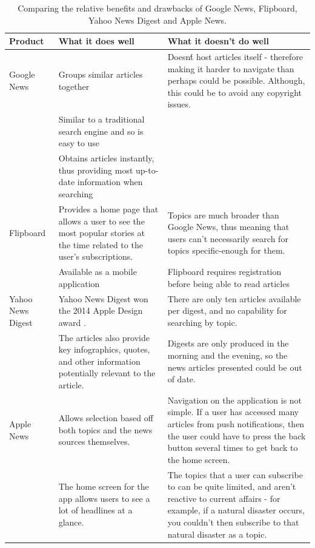 \documentclass[12pt]{article}
\newcommand{\tabitem}{\makebox[1em][r]{\textbullet~}}
\begin{document}
\begin{table}
    \begin{tabular}{p{2.5cm}|p{8.75cm}|p{8.75cm}}
    \textbf{Product} & \textbf{What it does well} & \textbf{What it doesn't do well} \\ \hline
    Google News & \tabitem Groups similar articles together & \tabitem Doesn\'t host articles itself - therefore making it harder to navigate than perhaps could be possible. Although, this could be to avoid any copyright issues. \\ & \tabitem Similar to a traditional search engine and so is easy to use\\ & \tabitem Obtains articles instantly, thus providing most up-to-date information when searching  \\ \hline
    Flipboard & \tabitem Provides a home page that allows a user to see the most popular stories at the time related to the user's subscriptions. & \tabitem Topics are much broader than Google News, thus meaning that users can't necessarily search for topics specific-enough for them.\\ & \tabitem Available as a mobile application & \tabitem Flipboard requires registration before being able to read articles \\ \hline
    Yahoo News Digest & \tabitem Yahoo News Digest won the 2014 Apple\index{Apple} Design award \cite{appleDesignAward}\index{Apple!Design award}. & \tabitem There are only ten articles available per digest, and no capability for searching by topic. \\ & \tabitem The articles also provide key infographics, quotes, and other information potentially relevant to the article. & \tabitem Digests are only produced in the morning and the evening, so the news articles presented could be out of date. \\ \hline
    Apple News & \tabitem Allows selection based off both topics and the news sources themselves. & \tabitem Navigation on the application is not simple. If a user has accessed many articles from push notifications, then the user could have to press the back button several times to get back to the home screen.\\ & \tabitem The home screen for the app allows users to see a lot of headlines at a glance. & \tabitem The topics that a user can subscribe to can be quite limited, and aren't reactive to current affairs - for example, if a natural disaster occurs, you couldn't then subscribe to that natural disaster as a topic. \\
  \end{tabular}
  \caption[Related Products in the market and their benefits and drawbacks]{Comparing the relative benefits and drawbacks of Google News, Flipboard, Yahoo News Digest and Apple News.}
  \label{relatedProductsTable}
\end{table}
\end{document}
